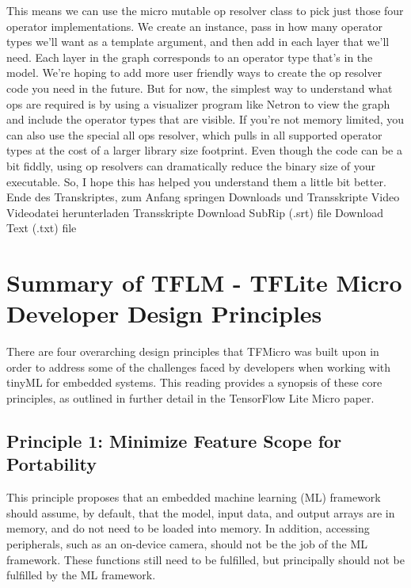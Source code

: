      This means we can use the micro mutable op resolver class to pick just
     those four operator implementations.
     We create an instance, pass in how many operator types
     we'll want as a template argument, and then add in each layer that we'll need.
     Each layer in the graph corresponds to an operator type that's in the model.
     We're hoping to add more user friendly ways to create the op resolver
     code you need in the future.
     But for now, the simplest way to understand what ops are required
     is by using a visualizer program like Netron to view the graph
     and include the operator types that are visible.
     If you're not memory limited, you can also
     use the special all ops resolver, which pulls
     in all supported operator types at the cost of a larger library size
     footprint.
     Even though the code can be a bit fiddly, using op resolvers
     can dramatically reduce the binary size of your executable.
     So, I hope this has helped you understand them a little bit better.
     Ende des Transkriptes, zum Anfang springen
     Downloads und Transskripte
     Video
     Videodatei herunterladen
     Transskripte
     Download SubRip (.srt) file
     Download Text (.txt) file
     
     \section{Summary of TFLM -  TFLite Micro Developer Design Principles}
     
 There are four overarching design principles that TFMicro was built upon in order to address some of the challenges faced by developers when working with tinyML for embedded systems. This reading provides a synopsis of these core principles, as outlined in further detail in the TensorFlow Lite Micro paper.
 
\subsection{Principle 1: Minimize Feature Scope for Portability}

 This principle proposes that an embedded machine learning (ML) framework should assume, by default, that the model, input data, and output arrays are in memory, and do not need to be loaded into memory. In addition, accessing peripherals, such as an on-device camera, should not be the job of the ML framework. These functions still need to be fulfilled, but principally should not be fulfilled by the ML framework.
 
